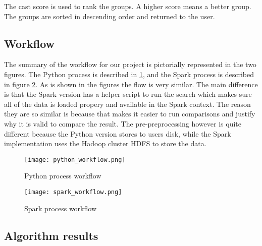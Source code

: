 The cast score is used to rank the groups. A higher score means a better group. The groups are sorted in descending order and returned to the user.



\subsection{Workflow}

The summary of the workflow for our project is pictorially represented in the two figures. The Python process is described in \ref{fig:python-process}, and the Spark process is described in figure \ref{fig:spark-process}. As is shown in the figures the flow is very similar. The main difference is that the Spark version has a helper script to run the search which makes sure all of the data is loaded propery and available in the Spark context. The reason they are so similar is because that makes it easier to run comparisons and justify why it is valid to compare the result. The pre-preprocessing however is quite different because the Python version stores to users disk, while the Spark implementation uses the Hadoop cluster HDFS to store the data.

\begin{figure}[t]
	\texttt{[image: python\_workflow.png]}
	\caption{Python process workflow}
	\label{fig:python-process}
\end{figure}


\begin{figure}[t]
	\texttt{[image: spark\_workflow.png]}
	\caption{Spark process workflow}
	\label{fig:spark-process}
\end{figure}



\subsection{Algorithm results}

